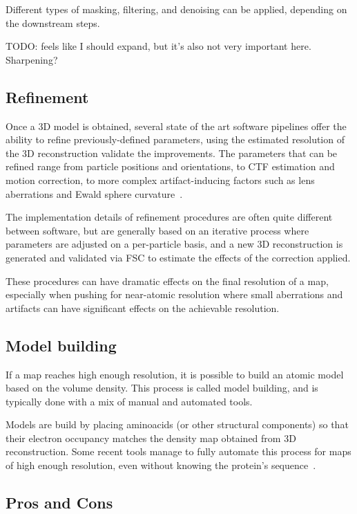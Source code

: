 Different types of masking, filtering, and denoising can be applied, depending on the downstream steps.

TODO: feels like I should expand, but it's also not very important here. Sharpening?

\subsection{Refinement}\label{em_refinement}
Once a 3D model is obtained, several state of the art software pipelines offer the ability to refine previously-defined parameters, using the estimated resolution of the 3D reconstruction validate the improvements.
The parameters that can be refined range from particle positions and orientations, to CTF estimation and motion correction, to more complex artifact-inducing factors such as lens aberrations and Ewald sphere curvature~\cite{tegunovMultiparticleCryoEMRefinement2021,punjaniCryoSPARCAlgorithmsRapid2017}.

The implementation details of refinement procedures are often quite different between software, but are generally based on an iterative process where parameters are adjusted on a per-particle basis, and a new 3D reconstruction is generated and validated via FSC to estimate the effects of the correction applied.

These procedures can have dramatic effects on the final resolution of a map, especially when pushing for near-atomic resolution where small aberrations and artifacts can have significant effects on the achievable resolution.

\subsection{Model building}

If a map reaches high enough resolution, it is possible to build an atomic model based on the volume density.
This process is called model building, and is typically done with a mix of manual and automated tools.

Models are build by placing aminoacids (or other structural components) so that their electron occupancy matches the density map obtained from 3D reconstruction.
Some recent tools manage to fully automate this process for maps of high enough resolution, even without knowing the protein's sequence~\cite{jamaliAutomatedModelBuilding2024}.

\subsection{Pros and Cons}

